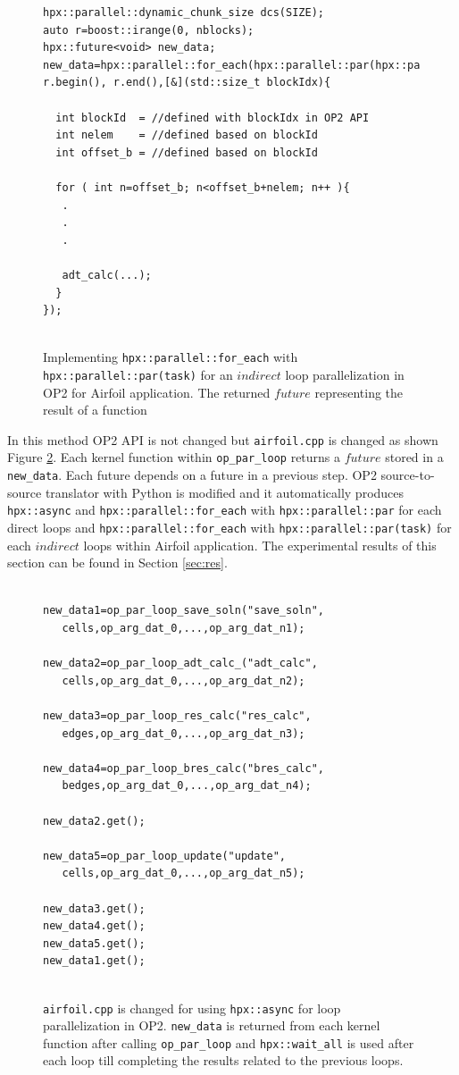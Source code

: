 \documentclass[conference]{IEEEtran}
\begin{document}
\begin{figure} 
    \begin{lstlisting}    
hpx::parallel::dynamic_chunk_size dcs(SIZE);
auto r=boost::irange(0, nblocks);
hpx::future<void> new_data;
new_data=hpx::parallel::for_each(hpx::parallel::par(hpx::parallel::task).with(dcs), r.begin(), r.end(),[&](std::size_t blockIdx){
  
  int blockId  = //defined with blockIdx in OP2 API
  int nelem    = //defined based on blockId 
  int offset_b = //defined based on blockId
        
  for ( int n=offset_b; n<offset_b+nelem; n++ ){
   .
   .
   .

   adt_calc(...);
  }
});
  
    \end{lstlisting}
    \caption{\small{Implementing \texttt{hpx::parallel::for\_each} with \texttt{hpx::parallel::par(task)} for an $indirect$ loop parallelization in OP2 for Airfoil application. The returned $future$ representing the result of a function}}
    \label{l6b}
\end{figure}

In this method OP2 API is not changed but \texttt{airfoil.cpp} is changed as shown Figure \ref{l4}. Each kernel function within \texttt{op\_par\_loop} returns a $future$ stored in a \texttt{new\_data}. Each future depends on a future in a previous step. OP2 source-to-source translator with Python is modified and it automatically produces \texttt{hpx::async} and \texttt{hpx::parallel::for\_each} with \texttt{hpx::parallel::par} for each direct loops and \texttt{hpx::parallel::for\_each} with \texttt{hpx::parallel::par(task)} for each $indirect$ loops within Airfoil application. The experimental results of this section can be found in Section \ref{sec:res}.

\begin{figure}
    \begin{lstlisting}   

new_data1=op_par_loop_save_soln("save_soln",
   cells,op_arg_dat_0,...,op_arg_dat_n1);
  
new_data2=op_par_loop_adt_calc_("adt_calc",
   cells,op_arg_dat_0,...,op_arg_dat_n2);
   
new_data3=op_par_loop_res_calc("res_calc",
   edges,op_arg_dat_0,...,op_arg_dat_n3);
 
new_data4=op_par_loop_bres_calc("bres_calc",
   bedges,op_arg_dat_0,...,op_arg_dat_n4);
   
new_data2.get();  
 
new_data5=op_par_loop_update("update",
   cells,op_arg_dat_0,...,op_arg_dat_n5);

new_data3.get();
new_data4.get();
new_data5.get();
new_data1.get();
    
    \end{lstlisting}
    \caption{\small{\texttt{airfoil.cpp} is changed for using \texttt{hpx::async} for loop parallelization in OP2. \texttt{new\_data} is returned from each kernel function after calling \texttt{op\_par\_loop} and \texttt{hpx::wait\_all} is used after each loop till completing the results related to the previous loops.}}
    \label{l4}
\end{figure}
\end{document}

